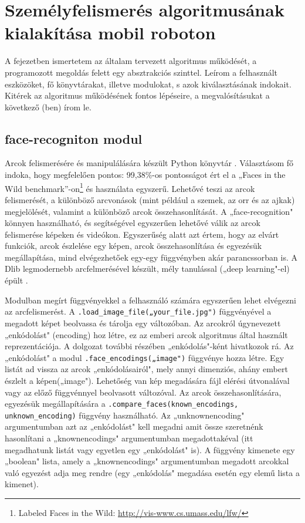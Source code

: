 \chapter{Személyfelismerés algoritmusának kialakítása mobil roboton}
\label{sec:algo}
A fejezetben ismertetem az általam tervezett algoritmus működését, a programozott megoldás felett egy absztrakciós szinttel. Leírom a felhasznált eszközöket, fő könyvtárakat, illetve modulokat, s azok kiválasztásának indokait. Kitérek az algoritmus működésének fontos lépéseire, a megvalósításukat a következő (ben) írom le.

\section{face-recogniton modul}
\label{sec:facerec}
Arcok felismerésére és manipulálására készült Python könyvtár \cite{artc31}. Választásom fő indoka, hogy megfelelően pontos: 99,38\%-os pontosságot ért el a „Faces in the Wild benchmark”-on\footnote{Labeled Faces in the Wild: \url{http://vis-www.cs.umass.edu/lfw/}} és használata egyszerű. Lehetővé teszi az arcok felismerését, a különböző arcvonások (mint például a szemek, az orr és az ajkak) megjelölését, valamint a különböző arcok összehasonlítását. A „face-recognition" könnyen használható, és segítségével egyszerűen lehetővé válik az arcok felismerése képeken és videókon. Egyszerűség alatt azt értem, hogy az elvárt funkciók, arcok észlelése egy képen, arcok összehasonlítása és egyezésük megállapítása, mind elvégezhetőek egy-egy függvényben akár parancssorban is. A Dlib legmodernebb arcfelmerésével készült, mély tanulással („deep learning"-el) épült \cite{artc31}.

Modulban megírt függvényekkel a felhasználó számára egyszerűen lehet elvégezni az arcfelismerést. A \verb|.load_image_file(„your_file.jpg")| függvényével a megadott képet beolvassa és tárolja egy változóban. Az arcokról úgynevezett „enkódolást" (encoding) hoz létre, ez az emberi arcok algoritmus által használt reprezentációja. A dolgozat további részében „enkódolás"-ként hivatkozok rá. Az „enkódolást" a modul \verb|.face_encodings(„image")| függvénye hozza létre. Egy listát ad vissza az arcok „enkódolásairól", mely annyi dimenziós, ahány embert észlelt a képen(„image"). Lehetőség van kép megadására fájl elérési útvonalával vagy az előző függvénnyel beolvasott változóval. Az arcok összehasonlítására, egyezésük megállapítására a \verb|.compare_faces(known_encodings, unknown_encoding)| függvény használható. Az „unknown\textunderscore encoding" argumentumban azt az „enkódolást" kell megadni amit össze szeretnénk hasonlítani a „known\textunderscore encodings" argumentumban megadottakéval (itt megadhatunk listát vagy egyetlen egy „enkódolást" is). A függvény kimenete egy „boolean" lista, amely a „known\textunderscore encodings" argumentumban megadott arcokkal való egyezést adja meg rendre (egy „enkódolás" megadása esetén egy elemű lista a kimenet).


